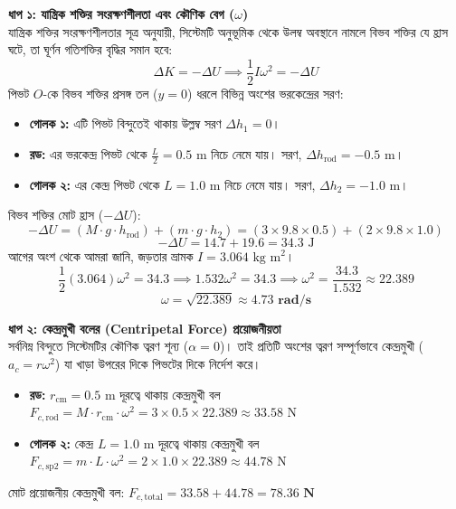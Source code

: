 \documentclass[12pt, a4paper]{article}
\begin{document}
\begin{tcolorbox}[solutionbox={সমাধান (Solution)}]
\noindent
\textbf{ধাপ ১: যান্ত্রিক শক্তির সংরক্ষণশীলতা এবং কৌণিক বেগ ($\omega$)} \\
যান্ত্রিক শক্তির সংরক্ষণশীলতার সূত্র অনুযায়ী, সিস্টেমটি অনুভূমিক থেকে উলম্ব অবস্থানে নামলে বিভব শক্তির যে হ্রাস ঘটে, তা ঘূর্ণন গতিশক্তির বৃদ্ধির সমান হবে:
\[ \Delta K = -\Delta U \implies \frac{1}{2}I\omega^2 = -\Delta U \]
পিভট $O$-কে বিভব শক্তির প্রসঙ্গ তল ($y = 0$) ধরলে বিভিন্ন অংশের ভরকেন্দ্রের সরণ:
\begin{itemize}[leftmargin=*, parsep=0.5ex]
    \item \textbf{গোলক ১:} এটি পিভট বিন্দুতেই থাকায় উল্লম্ব সরণ $\Delta h_1 = 0$।
    \item \textbf{রড:} এর ভরকেন্দ্র পিভট থেকে $\frac{L}{2} = 0.5\text{ m}$ নিচে নেমে যায়। সরণ, $\Delta h_{\text{rod}} = -0.5\text{ m}$।
    \item \textbf{গোলক ২:} এর কেন্দ্র পিভট থেকে $L = 1.0\text{ m}$ নিচে নেমে যায়। সরণ, $\Delta h_2 = -1.0\text{ m}$।
\end{itemize}
বিভব শক্তির মোট হ্রাস ($-\Delta U$):
\[ -\Delta U = (M \cdot g \cdot h_{\text{rod}}) + (m \cdot g \cdot h_2) = (3 \times 9.8 \times 0.5) + (2 \times 9.8 \times 1.0) \]
\[ -\Delta U = 14.7 + 19.6 = 34.3\text{ J} \]
আগের অংশ থেকে আমরা জানি, জড়তার ভ্রামক $I = 3.064\text{ kg m}^2$।
\[ \frac{1}{2} (3.064) \omega^2 = 34.3 \implies 1.532 \omega^2 = 34.3 \implies \omega^2 = \frac{34.3}{1.532} \approx 22.389 \]
\[ \omega = \sqrt{22.389} \approx \mathbf{4.73\text{ rad/s}} \]

\vspace{0.5em}
\noindent
\textbf{ধাপ ২: কেন্দ্রমুখী বলের (Centripetal Force) প্রয়োজনীয়তা} \\
সর্বনিম্ন বিন্দুতে সিস্টেমটির কৌণিক ত্বরণ শূন্য ($\alpha = 0$)। তাই প্রতিটি অংশের ত্বরণ সম্পূর্ণভাবে কেন্দ্রমুখী ($a_c = r\omega^2$) যা খাড়া উপরের দিকে পিভটের দিকে নির্দেশ করে।
\begin{itemize}[leftmargin=*, parsep=0.5ex]
    \item \textbf{রড:} $r_{\text{cm}} = 0.5\text{ m}$ দূরত্বে থাকায় কেন্দ্রমুখী বল $F_{c,\text{rod}} = M \cdot r_{\text{cm}} \cdot \omega^2 = 3 \times 0.5 \times 22.389 \approx 33.58\text{ N}$
    \item \textbf{গোলক ২:} কেন্দ্র $L = 1.0\text{ m}$ দূরত্বে থাকায় কেন্দ্রমুখী বল $F_{c,\text{sp2}} = m \cdot L \cdot \omega^2 = 2 \times 1.0 \times 22.389 \approx 44.78\text{ N}$
\end{itemize}
মোট প্রয়োজনীয় কেন্দ্রমুখী বল: $F_{c,\text{total}} = 33.58 + 44.78 = \mathbf{78.36\text{ N}}$


\end{tcolorbox}
\end{document}
